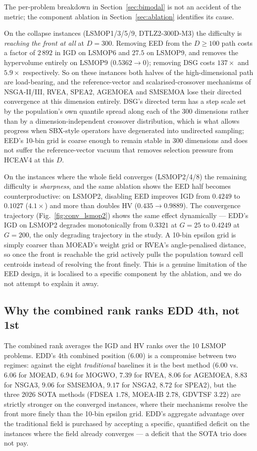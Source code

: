 \documentclass[preprint,12pt]{elsarticle}
\begin{document}
The per-problem breakdown in Section~\ref{sec:bimodal} is not an accident of
the metric; the component ablation in Section~\ref{sec:ablation} identifies
its cause.

On the collapse instances (LSMOP1/3/5/9, DTLZ2-300D-M3) the difficulty is
\emph{reaching the front at all} at $D = 300$. Removing EED from the
$D \ge 100$ path costs a factor of $2\,892$ in IGD on LSMOP6 and $27.5$ on
LSMOP9, and removes the hypervolume entirely on LSMOP9 ($0.5362 \to 0$);
removing DSG costs $137\times$ and $5.9\times$ respectively. So on these
instances both halves of the high-dimensional path are load-bearing, and the
reference-vector and scalarised-crossover mechanisms of NSGA-II/III, RVEA,
SPEA2, AGEMOEA and SMSEMOA lose their directed convergence at this dimension
entirely. DSG's directed term has a step scale set by the population's own
quantile spread along each of the 300 dimensions rather than by a
dimension-independent crossover distribution, which is what allows progress
when SBX-style operators have degenerated into undirected sampling; EED's
10-bin grid is coarse enough to remain stable in 300 dimensions and does not
suffer the reference-vector vacuum that removes selection pressure from
HCEAV4 at this $D$.

On the instances where the whole field converges (LSMOP2/4/8) the remaining
difficulty is \emph{sharpness}, and the same ablation shows the EED half
becomes counterproductive: on LSMOP2, disabling EED improves IGD from
$0.4249$ to $0.1027$ ($4.1\times$) and more than doubles HV
($0.435 \to 0.9889$). The convergence trajectory (Fig.~\ref{fig:conv_lsmop2})
shows the same effect dynamically --- EDD's IGD on LSMOP2 degrades
monotonically from $0.3321$ at $G = 25$ to $0.4249$ at $G = 200$, the only
degrading trajectory in the study. A 10-bin epsilon grid is simply coarser
than MOEAD's weight grid or RVEA's angle-penalised distance, so once the
front is reachable the grid actively pulls the population toward cell
centroids instead of resolving the front finely. This is a genuine limitation
of the EED design, it is localised to a specific component by the ablation,
and we do not attempt to explain it away.

\subsection{Why the combined rank ranks EDD 4th, not 1st}

The combined rank averages the IGD and HV ranks over the 10 LSMOP problems.
EDD's 4th combined position ($6.00$) is a compromise between two regimes:
against the eight \emph{traditional} baselines it is the best method
($6.00$ vs.\ $6.06$ for MOEAD, $6.94$ for MOGWO, $7.39$ for RVEA, $8.06$
for AGEMOEA, $8.83$ for NSGA3, $9.06$ for SMSEMOA, $9.17$ for NSGA2,
$8.72$ for SPEA2), but the three 2026 SOTA methods (FDSEA $1.78$, MOEA-IB
$2.78$, GDVTSF $3.22$) are strictly stronger on the converged instances,
where their mechanisms resolve the front more finely than the 10-bin
epsilon grid. EDD's aggregate advantage over the traditional field is
purchased by accepting a specific, quantified deficit on the instances where
the field already converges --- a deficit that the SOTA trio does not pay.
\end{document}
